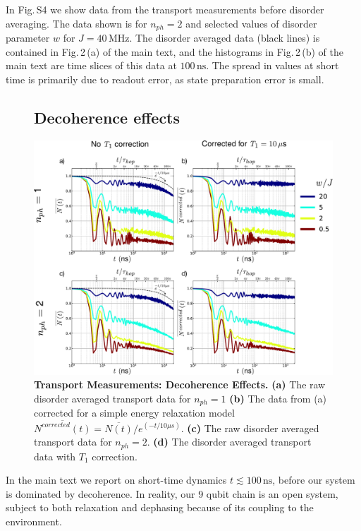 In Fig.\,S4 we show data from the transport measurements before disorder averaging.  The data shown is for $n_{ph}=2$ and selected values of disorder parameter $w$ for $J = 40 \, \text{MHz}$.
The disorder averaged data (black lines) is contained in Fig.\,2\,(a) of the main text, and the histograms in Fig.\,2\,(b) of the main text are time slices of this data at $100 \, \text{ns}$.
The spread in values at short time is primarily due to readout error, as state preparation error is small.

\begin{figure}[h]
\subsection{Decoherence effects}
\label{decoherence_effects}
\centering
\includegraphics[width=170mm, keepaspectratio]{./PDF/fs5_190919_1208p.pdf}%
\caption{\textbf{Transport Measurements:  Decoherence Effects.}
\textbf{(a)} The raw disorder averaged transport data for $n_{ph}=1$
\textbf{(b)} The data from (a) corrected for a simple energy relaxation model $\overline{N^{corrected} \left( t \right)} = \overline{N \left( t \right)} / e^{\left( -t/10 \mu s \right) }$.
\textbf{(c)} The raw disorder averaged transport data for $n_{ph}=2$.
\textbf{(d)} The disorder averaged transport data with $T_{1}$ correction.
}\end{figure}
In the main text we report on short-time dynamics $t\lesssim 100 \, \text{ns}$, before our system is dominated by decoherence.
In reality, our $9$ qubit chain is an open system, subject to both relaxation and dephasing because of its coupling to the environment.
